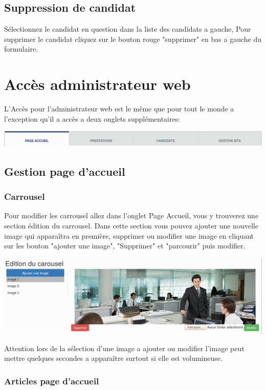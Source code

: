 \documentclass[a4paper, 12pt]{report}
\begin{document}
\subsection{Suppression de candidat}
Sélectionnez le candidat en question dans la liste des candidats a gauche, Pour supprimer le candidat cliquez sur le bouton rouge "supprimer" en bas a gauche du formulaire.

\newpage
\section{Accès administrateur web}
L'Accès pour l'administrateur web est le même que pour tout le monde a l’exception qu'il a accès a deux onglets supplémentaires:
\begin{center}
\includegraphics[width=16cm]{ongletsAdmin.png}
\end{center}
\subsection{Gestion page d'accueil}
\subsubsection{Carrousel}
Pour modifier les carrousel allez dans l'onglet Page Accueil, vous y trouverez une section édition du carrousel. Dans cette section vous pouvez ajouter une nouvelle image qui apparaîtra en première, supprimer ou modifier une image en cliquant sur les bouton "ajouter une image", "Supprimer" et "parcourir" puis modifier.
\begin{center}
\includegraphics[width=16cm]{editionCarousel.png}
\end{center}
Attention lors de la sélection d'une image a ajouter ou modifier l'image peut mettre quelques secondes a apparaître surtout si elle est volumineuse.
\subsubsection{Articles page d’accueil}
\end{document}
